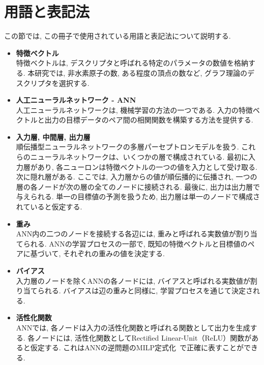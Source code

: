 \documentclass[11pt, titlepage, dvipdfmx, twoside]{jarticle}
\newcommand{\target}{目標}
\begin{document}

\section{用語と表記法}
\label{sec:Pre}
%
この節では, この冊子で使用されている用語と表記法について説明する. 


\begin{itemize}

\item {\bf 特徴ベクトル}\\
%
特徴ベクトルは, デスクリプタと呼ばれる特定のパラメータの数値を格納する. 
本研究では, 非水素原子の数, ある程度の頂点の数など, グラフ理論のデスクリプタを選択する. 

\item {\bf 人工ニューラルネットワーク - ANN}\\
%
人工ニューラルネットワークは, 機械学習の方法の一つである. 
入力の特徴ベクトルと出力の\target データのペア間の相関関数を構築する方法を提供する. 


\item {\bf 入力層,  中間層,  出力層}\\
%
順伝播型ニューラルネットワークの多層パーセプトロンモデルを扱う. 
これらのニューラルネットワークは、いくつかの層で構成されている. 
最初に入力層があり, 各ニューロンは特徴ベクトルの一つの値を入力として受け取る. 
次に隠れ層がある. ここでは, 入力層からの値が順伝播的に伝播され, 一つの層の各ノードが次の層の全てのノードに接続される. 
最後に, 出力は出力層で与えられる. 
単一の\target 値の予測を扱うため, 出力層は単一のノードで構成されていると仮定する. 

\item {\bf 重み}\\
%
ANN内の二つのノードを接続する各辺には, 重みと呼ばれる実数値が割り当てられる. 
ANNの学習プロセスの一部で, 既知の特徴ベクトルと\target 値のペアに基づいて, それぞれの重みの値を決定する. 

\item {\bf バイアス}\\
入力層のノードを除くANNの各ノードには, バイアスと呼ばれる実数値が割り当てられる. バイアスは辺の重みと同様に, 学習プロセスを通じて決定される. 


\item {\bf 活性化関数}\\
%
ANNでは, 各ノードは入力の活性化関数と呼ばれる関数として出力を生成する. 
各ノードには, 活性化関数としてRectified Linear-Unit（ReLU）関数があると仮定する. これはANNの逆問題のMILP定式化~\cite{AN19}で正確に表すことができる. 


\end{itemize}
\end{document}
